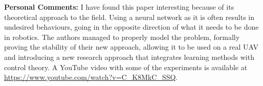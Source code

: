 \documentclass[a4paper]{article}
\begin{document}
\textbf{Personal Comments:} I have found this paper interesting because of
its theoretical approach to the field. Using a neural network as it is often
results in undesired behaviours, going in the opposite direction of what it
needs to be done in robotics. The authors managed to properly model the
problem, formally proving the stability of their new approach, allowing it
to be used on a real UAV and introducing a new research approach that
integrates learning methods with control theory.
A YouTube video with some of the experiments is available at
\url{https://www.youtube.com/watch?v=C_K8MkC_SSQ}.


\clearpage







\end{document}
